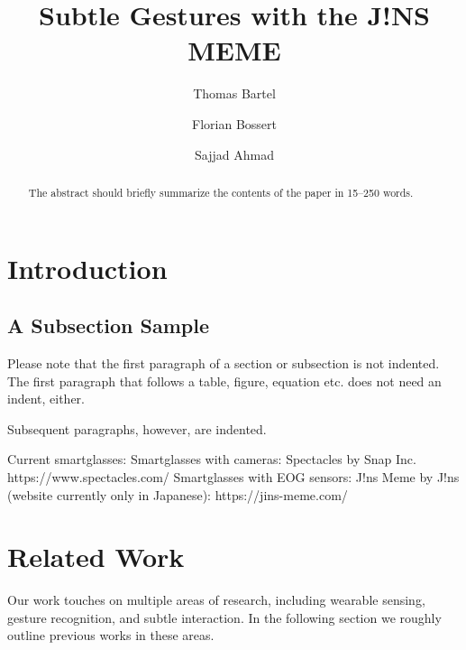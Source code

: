 \documentclass[runningheads]{llncs}
\begin{document}
%
\title{Subtle Gestures with the J!NS MEME}
%
\author{Thomas Bartel \and
Florian Bossert \and
Sajjad Ahmad}
%
%
%
\maketitle              %
%
\begin{abstract}
The abstract should briefly summarize the contents of the paper in
15--250 words.

\end{abstract}
%
%
%
\section{Introduction}
\subsection{A Subsection Sample}
Please note that the first paragraph of a section or subsection is
not indented. The first paragraph that follows a table, figure,
equation etc. does not need an indent, either.

Subsequent paragraphs, however, are indented.

Current smartglasses:
Smartglasses with cameras: Spectacles by Snap Inc. https://www.spectacles.com/
Smartglasses with EOG sensors: J!ns Meme by J!ns (website currently only in Japanese):
https://jins-meme.com/

\section{Related Work}
Our work touches on multiple areas of research, including wearable sensing, gesture
recognition, and subtle interaction. In the following section we roughly outline
previous works in these areas.
\end{document}
